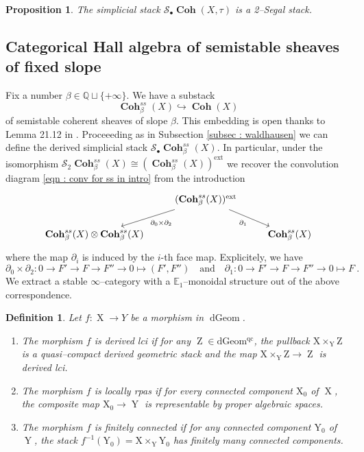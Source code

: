 \documentclass[11pt]{article}
\newtheorem{definition}{Definition}
\newtheorem{proposition}[theorem]{Proposition}
\newcommand{\BQ}{\mathbb{Q}}
\newcommand{\segal}{\mathcal{S}}
\newcommand{\cohbetassstack}{\boldsymbol{\operatorname{Coh}}^{ss}_{\beta}(X)}
\newcommand{\cohflat}{\boldsymbol{\operatorname{Coh}}}
\newcommand{\waldhausen}{\mathcal{S}_{\bullet}}
\begin{document}
    \begin{proposition}\label{prop : coh is segal}
        The simplicial stack $\waldhausen\cohflat(X,\tau)$ is a 2--Segal stack.
    \end{proposition}

    
\subsection{Categorical Hall algebra of semistable sheaves of fixed slope}\label{subsec : Categorical Hall algebra of semistable sheaves of fixed slope}
     Fix a number $\beta \in \BQ\sqcup\{+\infty\}$. We have a substack
    \begin{equation}\label{eqn : cohssbeta embedding}
        \cohbetassstack \hookrightarrow \cohflat (X)
    \end{equation}
    of semistable coherent sheaves of slope $\beta$. This embedding is open thanks to Lemma 21.12 in \cite{Bayer_2021}. Proceeeding as in Subsection \ref{subsec : waldhausen} we can define the derived simplicial stack $\waldhausen\cohbetassstack$. In particular, under the isomorphism $\segal_2\cohbetassstack \cong (\cohbetassstack)^{\operatorname{ext}}$ we recover the convolution diagram \eqref{eqn : conv for ss in intro} from the introduction
    \[\begin{tikzcd}
	& {(\cohbetassstack)^{\operatorname{ext}}} & \\
	{\cohbetassstack \otimes \cohbetassstack} && \cohbetassstack
	\arrow["\partial_0 \times \partial_2", from=1-2, to=2-1]
	\arrow["\partial_1"', from=1-2, to=2-3]
\end{tikzcd}\]
where the map $\partial_i$ is induced by the $i$-th face map. Explicitely, we have
\[
\partial_0 \times\partial_2 \colon 0\rightarrow F'\rightarrow F \rightarrow F'' \rightarrow 0 \mapsto (F', F'') \quad \text{and} \quad \partial_1  \colon 0\rightarrow F'\rightarrow F \rightarrow F'' \rightarrow 0 \mapsto F\ .
\]
We extract a stable $\infty$--category with a $\mathbb{E}_1$--monoidal structure out of the above correspondence. 
    \begin{definition}
            Let $f \colon \operatorname{X} \rightarrow Y$ be a morphism in $\operatorname{dGeom}$.
        \begin{enumerate}
            \item The morphism $f$ is \textit{derived lci} if for any $\operatorname{Z} \in \operatorname{dGeom^{qc}}$, the pullback $\operatorname{X\times_{Y}Z}$ is a quasi--compact derived geometric stack and the map $\operatorname{X\times_{Y}Z} \rightarrow \operatorname{Z}$ is derived lci.
            \item The morphism $f$ is \textit{locally rpas} if for every connected component $\operatorname{X_0}$ of $\operatorname{X}$, the composite map $\operatorname{X_0}\rightarrow \operatorname{Y}$ is representable by proper algebraic spaces.
            \item The morphism $f$ is \textit{finitely connected} if for any connected component $\operatorname{Y_0}$ of $\operatorname{Y}$, the stack $f^{-1}(\operatorname{Y_0}) = \operatorname{X\times_{Y}Y_0}$ has finitely many connected components.
        \end{enumerate}
    \end{definition}
\end{document}
